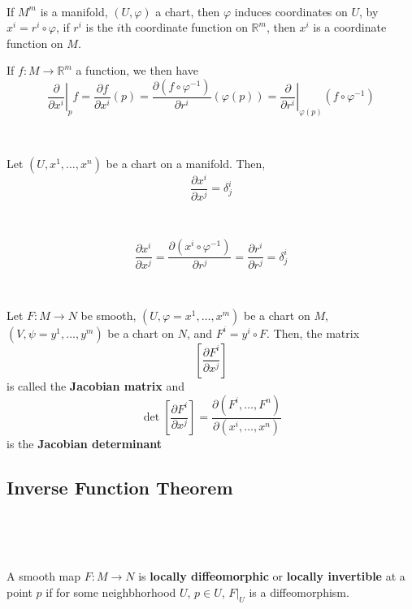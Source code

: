 \documentclass{article}
\begin{document}
\begin{definition}
  \

  If $M^m$ is a manifold, $(U, \varphi)$ a chart, then $\varphi$ induces coordinates on $U$, by $x^i = r^i \circ \varphi$, if $r^i$ is the $i$th coordinate function on $\mathbb{R}^m$, then $x^i$ is a coordinate function on $M$.

  If $f: M \to \mathbb{R}^m$ a function, we then have $$\left.\frac{\partial}{\partial x^i} \right\vert_p f = \frac{\partial f}{\partial x^i}(p) = \frac{\partial (f \circ \varphi ^{-1})}{\partial r^i}(\varphi(p)) = \left.\frac{\partial }{\partial r^i}\right\vert_{\varphi(p)} (f \circ \varphi ^{-1})$$
\end{definition}

\begin{proposition}
  \

  Let $(U, x^1, \dots, x^n)$ be a chart on a manifold. Then, $$\frac{\partial x^i}{\partial x^j} = \delta^i_j$$
\end{proposition}

\begin{customproof}
  \

  $$\frac{\partial x^i}{\partial x^j} = \frac{\partial (x^i \circ \varphi ^{-1})}{\partial r^j} = \frac{\partial r^i}{\partial r^j} = \delta_j^i$$
\end{customproof}

\begin{definition}[Jacobian]
  \

  Let $F: M\to N$ be smooth, $(U, \varphi = x^1, \dots, x^m)$ be a chart on $M$, $(V, \psi = y^1, \dots, y^m)$ be a chart on $N$, and $F^i = y^i \circ F$. Then, the matrix $$[\frac{\partial F^i}{\partial x^j}]$$is called the \textbf{Jacobian matrix} and $$\det[\frac{\partial F^i}{\partial x^j}] = \frac{\partial (F^i, \dots, F^n)}{\partial(x^i, \dots, x^n)}$$is the \textbf{Jacobian determinant}
\end{definition}

\subsection{Inverse Function Theorem}
\

\begin{definition}
  \

  A smooth map $F: M \to N$ is \textbf{locally diffeomorphic} or \textbf{locally invertible} at a point $p$ if for some neighbhorhood $U$, $p \in U$, $F \vert_U$ is a diffeomorphism.
\end{definition}
\end{document}
